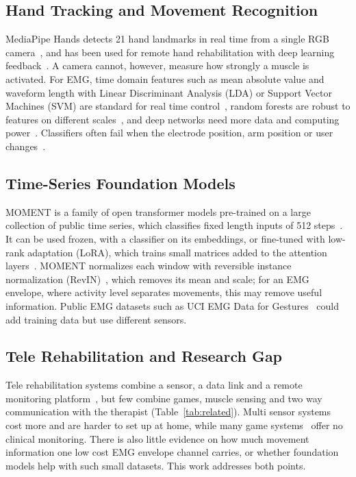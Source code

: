 \documentclass[10pt,a4paper,twocolumn]{article}
\begin{document}
\subsection{Hand Tracking and Movement Recognition}

MediaPipe Hands detects 21 hand landmarks in real time from a single RGB camera~\cite{zhang2020}, and has been used for remote hand rehabilitation with deep learning feedback~\cite{dhuzuki2025}. A camera cannot, however, measure how strongly a muscle is activated. For EMG, time domain features such as mean absolute value and waveform length with Linear Discriminant Analysis (LDA) or Support Vector Machines (SVM) are standard for real time control~\cite{geng2017}, random forests are robust to features on different scales~\cite{breiman2001}, and deep networks need more data and computing power~\cite{panwar2019}. Classifiers often fail when the electrode position, arm position or user changes~\cite{geng2017}.

\subsection{Time-Series Foundation Models}

MOMENT is a family of open transformer models pre-trained on a large collection of public time series, which classifies fixed length inputs of 512 steps~\cite{goswami2024}. It can be used frozen, with a classifier on its embeddings, or fine-tuned with low-rank adaptation (LoRA), which trains small matrices added to the attention layers~\cite{hu2022}. MOMENT normalizes each window with reversible instance normalization (RevIN)~\cite{kim2022}, which removes its mean and scale; for an EMG envelope, where activity level separates movements, this may remove useful information. Public EMG datasets such as UCI EMG Data for Gestures~\cite{lobov2018} could add training data but use different sensors.

\subsection{Tele Rehabilitation and Research Gap}

Tele rehabilitation systems combine a sensor, a data link and a remote monitoring platform~\cite{lee2018,marin2021}, but few combine games, muscle sensing and two way communication with the therapist (Table~\ref{tab:related}). Multi sensor systems~\cite{yin2018,jiang2018} cost more and are harder to set up at home, while many game systems~\cite{heins2017,ibrahim2024} offer no clinical monitoring. There is also little evidence on how much movement information one low cost EMG envelope channel carries, or whether foundation models help with such small datasets. This work addresses both points.
\end{document}
